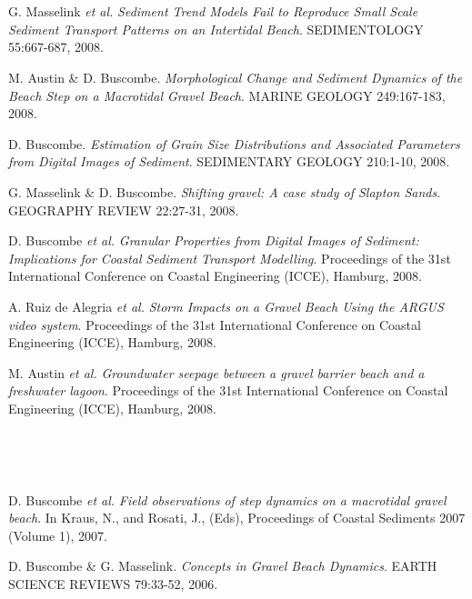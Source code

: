 \documentclass{article} %
\def\sf{\sffamily}
\def\sl{\slshape}
\newlength\sidebarwidth
\newcommand{\subtopic}[3][]
	 {\begin{minipage}{\textwidth}
	 \vspace*{.4\baselineskip}
         \nopagebreak\hspace{0in}%
         \nopagebreak\begin{minipage}[t]{\sidebarwidth - .2cm}
         \raggedleft {\sf\fontseries{sbc}\selectfont #2}
         {\\[-0.2\baselineskip] \textcolor{gray}{\footnotesize #1}}
	 \end{minipage}%
	 \hfill
	 \begin{minipage}[t]{\linewidth - \sidebarwidth}
	 #3%
	 \end{minipage}%
	 \vspace*{.2\baselineskip plus 1\baselineskip minus
	 .2\baselineskip}%
	 \end{minipage}}
\begin{document}
\subtopic{\hspace*{-3ex} 2008}{~
  \begin{itemize}[leftmargin=0ex, itemsep=0ex, parsep=.5ex, labelindent=-4ex]

    \publication
      G. Masselink {\sl et al.}
      {\sl Sediment Trend Models Fail to Reproduce Small Scale Sediment Transport Patterns on an Intertidal Beach}.
      SEDIMENTOLOGY 55:667-687, 2008.

    \publication
      M. Austin \& D. Buscombe.
      {\sl Morphological Change and Sediment Dynamics of the Beach Step on a Macrotidal Gravel Beach}.
      MARINE GEOLOGY 249:167-183, 2008.

    \publication
      D. Buscombe.
      {\sl Estimation of Grain Size Distributions and Associated Parameters from Digital Images of Sediment}.
      SEDIMENTARY GEOLOGY 210:1-10, 2008.

    \publication
      G. Masselink \& D. Buscombe.
      {\sl Shifting gravel: A case study of Slapton Sands}.
      GEOGRAPHY REVIEW 22:27-31, 2008.

    \publication
      D. Buscombe {\sl et al.}
      {\sl Granular Properties from Digital Images of Sediment: Implications for Coastal Sediment Transport Modelling}.
      Proceedings of the 31st International Conference on Coastal Engineering (ICCE), Hamburg, 2008.

    \publication
      A. Ruiz de Alegria {\it et al.}
      {\it Storm Impacts on a Gravel Beach Using the ARGUS video system}.
      Proceedings of the 31st International Conference on Coastal Engineering (ICCE), Hamburg, 2008.

    \publication
      M. Austin {\sl et al.}
      {\it Groundwater seepage between a gravel barrier beach and a freshwater lagoon}.
      Proceedings of the 31st International Conference on Coastal Engineering (ICCE), Hamburg, 2008.

    \end{itemize}
}

\subtopic{\hspace*{-3ex} 2006--2007}{~
  \begin{itemize}[leftmargin=0ex, itemsep=0ex, parsep=.5ex, labelindent=-4ex]

    \publication
      D. Buscombe {\sl et al.}
      {\it Field observations of step dynamics on a macrotidal gravel beach}.
      In Kraus, N., and Rosati, J., (Eds), Proceedings of Coastal Sediments 2007 (Volume 1), 2007.

    \publication
      D. Buscombe \& G. Masselink.
      {\it Concepts in Gravel Beach Dynamics}.
      EARTH SCIENCE REVIEWS 79:33-52, 2006.

  \end{itemize}

}
\end{document}
